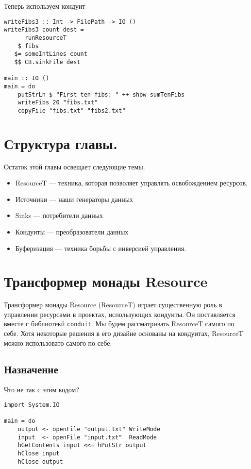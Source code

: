 Теперь используем кондуит
\begin{lstlisting}
writeFibs3 :: Int -> FilePath -> IO ()
writeFibs3 count dest =
      runResourceT
    $ fibs
   $= someIntLines count
   $$ CB.sinkFile dest

main :: IO ()
main = do
    putStrLn $ "First ten fibs: " ++ show sumTenFibs
    writeFibs 20 "fibs.txt"
    copyFile "fibs.txt" "fibs2.txt"
\end{lstlisting}

\section{Структура главы.}

Остаток этой главы освещает следующие темы.
\begin{itemize}
 \item ResourceT --- техника, которая позволяет управлять освобождением ресурсов.
 \item Источники --- наши генераторы данных
 \item Sinks --- потребители данных
 \item Кондуиты --- преобразователи данных
 \item Буферизация --- техника борьбы с инверсией управления.
\end{itemize}

\section{Трансформер монады Resource}

Трансформер монады Resource (ResourceT) играет существенную роль в управлении ресурсами в
проектах, использующих кондуиты. Он поставляется вместе с библиотекй \verb=conduit=. Мы
будем рассматривать ResourceT самого по себе. Хотя некоторые решения в его дизайне
основаны на кондуитах, ResourceT можно использовато самого по себе.

\subsection{Назначение}

Что не так с этим кодом?
\begin{lstlisting}
import System.IO

main = do
    output <- openFile "output.txt" WriteMode
    input  <- openFile "input.txt"  ReadMode
    hGetContents input <<= hPutStr output
    hClose input
    hClose output
\end{lstlisting}

